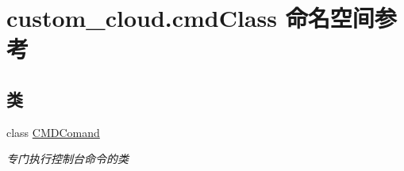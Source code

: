 \hypertarget{namespacecustom__cloud_1_1cmd_class}{}\section{custom\+\_\+cloud.\+cmd\+Class 命名空间参考}
\label{namespacecustom__cloud_1_1cmd_class}
\subsection*{类}
\begin{DoxyCompactItemize}
\item 
class \hyperlink{classcustom__cloud_1_1cmd_class_1_1_c_m_d_comand}{C\+M\+D\+Comand}
\begin{DoxyCompactList}\small\item\em 专门执行控制台命令的类 \end{DoxyCompactList}\end{DoxyCompactItemize}
